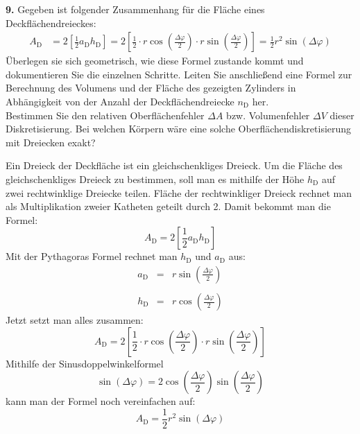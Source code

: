 \documentclass[Protokollheft.tex]{subfiles}
\begin{document}
    \begin{framed}
	\noindent \textbf{9.} Gegeben ist folgender Zusammenhang für die Fläche eines Deckflächendreieckes:
        \begin{align}
        A_\text{D} &= 2 \left[\frac12 a_\text{D} h_\text{D}\right] = 2 \left[ \frac12 \cdot r \cos\left(\frac{\Delta \varphi}{2}\right)\cdot r \sin\left(\frac{\Delta \varphi}{2}\right)  \right] = \frac12 r^2 \sin(\Delta\varphi)
        \end{align}
        Überlegen sie sich geometrisch, wie diese Formel zustande kommt und dokumentieren Sie die einzelnen Schritte. Leiten Sie anschließend eine Formel zur Berechnung des Volumens und der Fläche des gezeigten Zylinders in Abhängigkeit von der Anzahl der Deckflächendreiecke $n_\mathrm{D}$ her.\\
        Bestimmen Sie den relativen Oberflächenfehler $\Delta A$ bzw. Volumenfehler $\Delta V$ dieser Diskretisierung.
        Bei welchen Körpern wäre eine solche Oberflächendiskretisierung mit Dreiecken exakt?\label{exer:deltaAdeltaV}
\end{framed}

Ein Dreieck der Deckfläche ist ein gleichschenkliges Dreieck. Um die Fläche des gleichschenkliges Dreieck zu bestimmen, soll man es mithilfe der Höhe  $h_\text{D}$ auf zwei rechtwinklige Dreiecke teilen. Fläche der rechtwinkliger Dreieck rechnet man als Multiplikation zweier Katheten geteilt durch 2. Damit bekommt man die Formel: 
$$ A_\text{D} = 2 \left[\frac12 a_\text{D} h_\text{D}\right]$$
Mit der Pythagoras Formel rechnet man  $h_\text{D}$ und $a_\text{D}$ aus:
\begin{eqnarray*}
	a_\text{D}&=&r \sin\left(\frac{\Delta \varphi}{2}\right)\\
	\\
	h_\text{D}&=&r \cos\left(\frac{\Delta \varphi}{2}\right)
\end{eqnarray*}
Jetzt setzt man alles zusammen:
 $$A_\text{D} = 2 \left[ \frac12 \cdot r \cos\left(\frac{\Delta \varphi}{2}\right)\cdot r \sin\left(\frac{\Delta \varphi}{2}\right)  \right]$$
 Mithilfe der Sinusdoppelwinkelformel
 $$  \sin(\Delta\varphi)=2 \cos\left(\frac{\Delta \varphi}{2}\right) \sin\left(\frac{\Delta \varphi}{2}\right)  $$
 kann man der Formel noch vereinfachen auf:
  $$A_\text{D} =  \frac12 r^2 \sin(\Delta\varphi)$$
  
\end{document}
